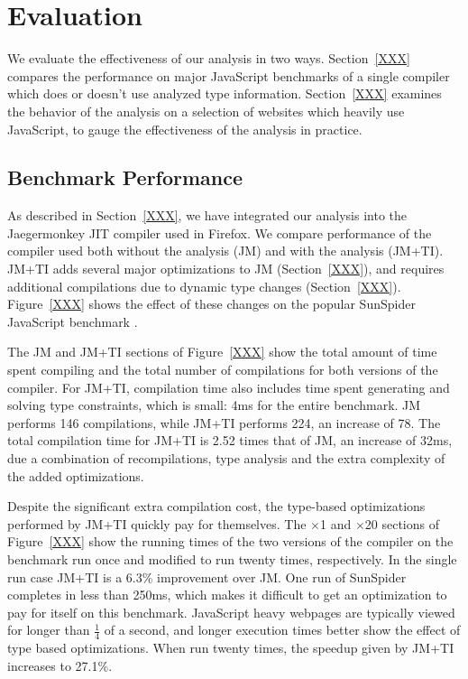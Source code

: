 
\section{Evaluation}

We evaluate the effectiveness of our analysis in two ways.
Section~\ref{XXX} compares the performance on major JavaScript benchmarks
of a single compiler which does or doesn't use analyzed type information.
Section~\ref{XXX} examines the behavior of the analysis on a selection of
websites which heavily use JavaScript, to gauge the effectiveness of the
analysis in practice.

\subsection{Benchmark Performance}

As described in Section~\ref{XXX}, we have integrated our analysis into
the Jaegermonkey JIT compiler used in Firefox.
We compare performance of the compiler used both without the analysis (JM)
and with the analysis (JM+TI).
JM+TI adds several major optimizations to JM (Section~\ref{XXX}),
and requires additional compilations due to dynamic type changes
(Section~\ref{XXX}).
Figure~\ref{XXX} shows the effect of these changes on the popular
SunSpider JavaScript benchmark \cite{XXX}.

The JM and JM+TI sections of Figure~\ref{XXX} show the total amount of time
spent compiling and the total number of compilations for both versions of
the compiler.
For JM+TI, compilation time also includes time spent generating and solving
type constraints, which is small: 4ms for the entire benchmark.
JM performs 146 compilations, while JM+TI performs 224, an increase of 78.
The total compilation time for JM+TI is 2.52 times that of JM, an increase
of 32ms, due a combination of recompilations, type analysis and the extra
complexity of the added optimizations.

Despite the significant extra compilation cost, the type-based optimizations
performed by JM+TI quickly pay for themselves. The $\times$1 and
$\times$20 sections
of Figure~\ref{XXX} show the running times of the two versions of the
compiler on the benchmark run once and modified to run twenty times,
respectively.
In the single run case JM+TI is a 6.3\% improvement over JM.
One run of SunSpider completes in less than 250ms, which makes it
difficult to get an optimization to pay for itself on this benchmark.
JavaScript heavy webpages are typically viewed for longer than
$\frac{1}{4}$ of a second, and longer execution times better show the effect
of type based optimizations.
When run twenty times, the speedup given by JM+TI increases to 27.1\%.

